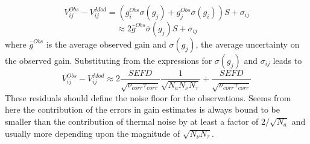 \documentclass[11pt]{article}
\begin{document}
\begin{enumerate}
\begin{equation}
V_{ij}^{Obs} - V_{ij}^{Mod} = (g_i^{Obs}\sigma(g_j) + g_j^{Obs}\sigma(g_i)) S + \sigma_{ij}
\end{equation}
\begin{equation}
\approx 2\bar g^{Obs}\bar \sigma(g_j) S + \sigma_{ij}
\end{equation}
where $\bar g^{Obs}$ is the average observed gain and $\sigma(g_j)$, the average uncertainty on the observed gain.
Substituting from the expressions for $\sigma(g_j)$ and $\sigma_{ij}$ leads to
\begin{equation}
V_{ij}^{Obs} - V_{ij}^{Mod} \approx
2
\frac {SEFD} {\sqrt{\nu_{corr} \tau_{corr}}} \frac {1} {\sqrt{N_a N_{\nu} N_{\tau}}} + \frac {SEFD} {\sqrt{\nu_{corr} \tau_{corr}}}
\end{equation}
These residuals should define the noise floor for the observations.
Seems from here the contribution of the errors in gain estimates is always bound to be smaller than the contribution of thermal noise by at least a factor of $2/\sqrt{N_a}$ and usually more depending upon the magnitude of $\sqrt{N_{\nu} N_{\tau}}$.
\end{enumerate}

\end{document}
